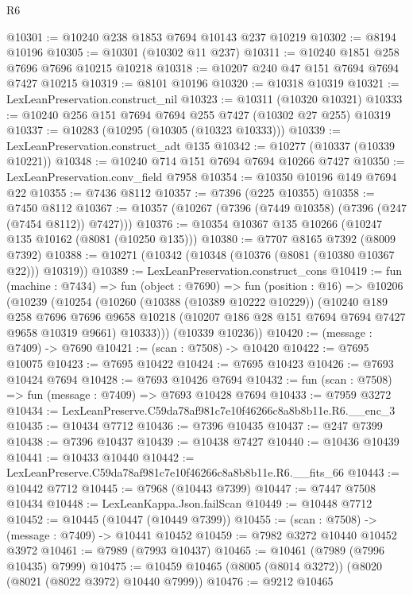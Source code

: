 \begin{lexlean}{R6}
\begin{coremodule}
@10301 := @10240 @238 @1853 @7694 @10143 @237 @10219
@10302 := @8194 @10196
@10305 := @10301 (@10302 @11 @237)
@10311 := @10240 @1851 @258 @7696 @7696 @10215 @10218
@10318 := @10207 @240 @47 @151 @7694 @7694 @7427 @10215
@10319 := @8101 @10196
@10320 := @10318 @10319
@10321 := LexLeanPreservation.construct_nil
@10323 := @10311 (@10320 @10321)
@10333 := @10240 @256 @151 @7694 @7694 @255 @7427 (@10302 @27 @255) @10319
@10337 := @10283 (@10295 (@10305 (@10323 @10333)))
@10339 := LexLeanPreservation.construct_adt @135
@10342 := @10277 (@10337 (@10339 @10221))
@10348 := @10240 @714 @151 @7694 @7694 @10266 @7427
@10350 := LexLeanPreservation.conv_field @7958
@10354 := @10350 @10196 @149 @7694 @22
@10355 := @7436 @8112
@10357 := @7396 (@225 @10355)
@10358 := @7450 @8112
@10367 := @10357 (@10267 (@7396 (@7449 @10358) (@7396 (@247 (@7454 @8112)) @7427)))
@10376 := @10354 @10367 @135 @10266 (@10247 @135 @10162 (@8081 (@10250 @135)))
@10380 := @7707 @8165 @7392 (@8009 @7392)
@10388 := @10271 (@10342 (@10348 (@10376 (@8081 (@10380 @10367 @22))) @10319))
@10389 := LexLeanPreservation.construct_cons
@10419 := fun (machine : @7434) =>
  fun (object : @7690) =>
  fun (position : @16) =>
  @10206
    (@10239
      (@10254
        (@10260
          (@10388 (@10389 @10222 @10229))
          (@10240
            @189
            @258
            @7696
            @7696
            @9658
            @10218
            (@10207 @186 @28 @151 @7694 @7694 @7427 @9658 @10319 @9661)
            @10333)))
      (@10339 @10236))
@10420 := (message : @7409) -> @7690
@10421 := (scan : @7508) -> @10420
@10422 := @7695 @10075
@10423 := @7695 @10422
@10424 := @7695 @10423
@10426 := @7693 @10424 @7694
@10428 := @7693 @10426 @7694
@10432 := fun (scan : @7508) => fun (message : @7409) => @7693 @10428 @7694
@10433 := @7959 @3272
@10434 := LexLeanPreserve.C59da78af981c7e10f46266c8a8b8b11e.R6.__enc_3
@10435 := @10434 @7712
@10436 := @7396 @10435
@10437 := @247 @7399
@10438 := @7396 @10437
@10439 := @10438 @7427
@10440 := @10436 @10439
@10441 := @10433 @10440
@10442 := LexLeanPreserve.C59da78af981c7e10f46266c8a8b8b11e.R6.__fits_66
@10443 := @10442 @7712
@10445 := @7968 (@10443 @7399)
@10447 := @7447 @7508 @10434
@10448 := LexLeanKappa.Json.failScan
@10449 := @10448 @7712
@10452 := @10445 (@10447 (@10449 @7399))
@10455 := (scan : @7508) -> (message : @7409) -> @10441 @10452
@10459 := @7982 @3272 @10440 @10452 @3972
@10461 := @7989 (@7993 @10437)
@10465 := @10461 (@7989 (@7996 @10435) @7999)
@10475 := @10459 @10465 (@8005 (@8014 @3272)) (@8020 (@8021 (@8022 @3972) @10440 @7999))
@10476 := @9212 @10465

\end{coremodule}
\end{lexlean}
